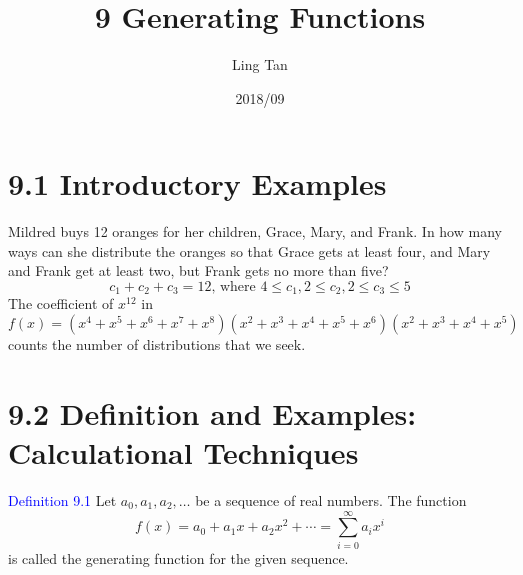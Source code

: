 \documentclass[a4paper]{article}
\title{9 Generating Functions}
\author{Ling Tan}
\date{2018/09}
\begin{document}
\maketitle

\section*{9.1 Introductory Examples}
Mildred buys 12 oranges for her children, Grace, Mary, and Frank. In how many ways can she distribute the oranges so that Grace gets at least four, and Mary and Frank get at least two, but Frank gets no more than five?
$$c_1+c_2+c_3=12\text{, where } 4\leq c_1, 2\leq c_2, 2\leq c_3\leq 5$$
The coefficient of $x^{12}$ in 
$$f(x)=(x^4+x^5+x^6+x^7+x^8)(x^2+x^3+x^4+x^5+x^6)(x^2+x^3+x^4+x^5)$$
counts the number of distributions that we seek.

\section*{9.2 Definition and Examples: Calculational Techniques}
\textcolor{blue}{Definition 9.1} Let $a_0,a_1,a_2,\ldots$ be a sequence of real numbers. The function
$$f(x)=a_0+a_1x+a_2x^2+\cdots=\sum_{i=0}^{\infty}{a_ix^i}$$
is called the generating function for the given sequence.
\end{document}
